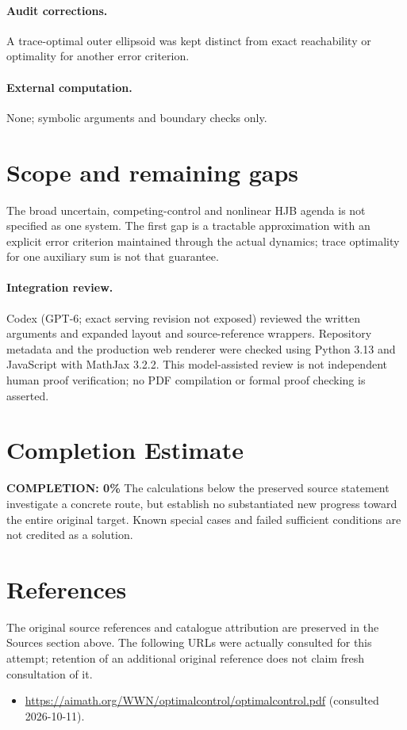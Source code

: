 \documentclass[11pt]{article}
\begin{document}
\paragraph{Audit corrections.} A trace-optimal outer ellipsoid was kept distinct from exact reachability or optimality for another error criterion.
\paragraph{External computation.} None; symbolic arguments and boundary checks only.
\section{Scope and remaining gaps}
The broad uncertain, competing-control and nonlinear HJB agenda is not
specified as one system. The first gap is a tractable approximation with an
explicit error criterion maintained through the actual dynamics; trace optimality
for one auxiliary sum is not that guarantee.
\paragraph{Integration review.} Codex (GPT-6; exact serving revision not exposed) reviewed the written arguments and expanded layout and source-reference wrappers. Repository metadata and the production web renderer were checked using Python 3.13 and JavaScript with MathJax 3.2.2. This model-assisted review is not independent human proof verification; no PDF compilation or formal proof checking is asserted.

\section{Completion Estimate}
\noindent\textbf{COMPLETION: 0\%}
The calculations below the preserved source statement investigate a concrete route,
but establish no substantiated new progress toward the entire original target.
Known special cases and failed sufficient conditions are not credited as a solution.
\section{References}
The original source references and catalogue attribution are preserved in the
Sources section above. The following URLs were actually consulted for this attempt;
retention of an additional original reference does not claim fresh consultation of it.
\begin{itemize}
\item \url{https://aimath.org/WWN/optimalcontrol/optimalcontrol.pdf} (consulted 2026-10-11). 
\end{itemize}
\end{document}
